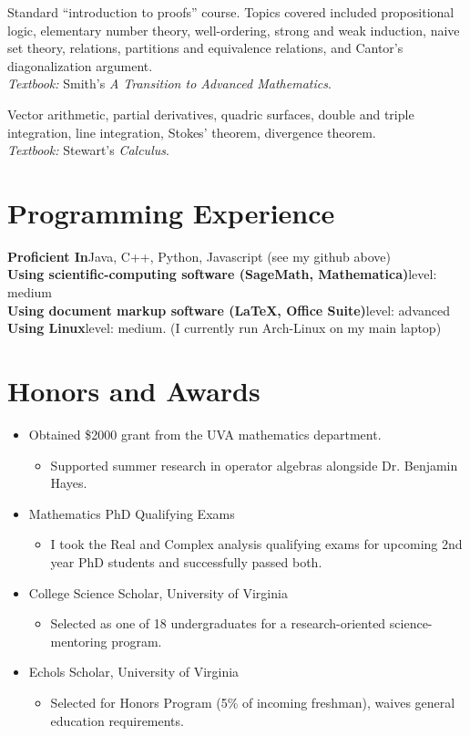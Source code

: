 \documentclass[11pt,letterpaper,sans]{moderncv}
\begin{document}
%
  {Standard ``introduction to proofs'' course. Topics covered included propositional logic, elementary number theory, well-ordering, strong and weak induction, naive set theory, relations, partitions and equivalence relations, and Cantor's diagonalization argument. \\ \emph{Textbook: }Smith's \emph{A Transition to Advanced Mathematics}.}

%
  {Vector arithmetic, partial derivatives, quadric surfaces, double and triple integration, line integration, Stokes' theorem, divergence theorem. \\ \emph{Textbook: }Stewart's \emph{Calculus}.}


\section{Programming Experience}
\textbf{Proficient In}\quad Java, C++, Python, Javascript (see my github above) \\
\textbf{Using scientific-computing software (SageMath, Mathematica)}\quad level: medium \\
\textbf{Using document markup software (\LaTeX, Office Suite)}\quad level: advanced \\
\textbf{Using Linux}\quad level: medium. (I currently run Arch-Linux on my main laptop)


\section{Honors and Awards}
\begin{itemize}
  \item Obtained \$2000 grant from the UVA mathematics department.
  \begin{itemize}
    \item Supported summer research in operator algebras alongside Dr. Benjamin Hayes.
  \end{itemize}
  \item Mathematics PhD Qualifying Exams
  \begin{itemize}
    \item I took the Real and Complex analysis qualifying exams for upcoming 2nd year PhD students and successfully passed both.
  \end{itemize}
  \item College Science Scholar, University of Virginia
  \begin{itemize}
    \item Selected as one of 18 undergraduates for a research-oriented science-mentoring program.
  \end{itemize}


  \item Echols Scholar, University of Virginia
  \begin{itemize}
    \item Selected for Honors Program (5\% of incoming freshman), waives general education requirements.
  \end{itemize}
  
\end{itemize}
\end{document}
